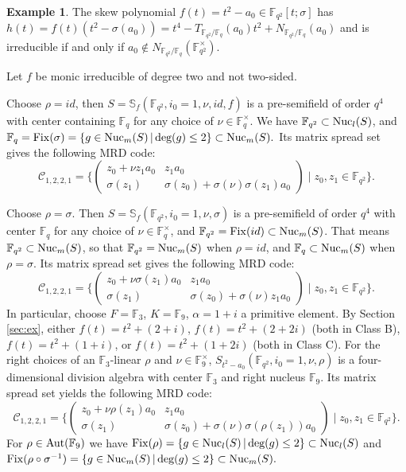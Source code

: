 \documentclass[12pt]{amsart}
\theoremstyle{plain}
\theoremstyle{definition}
\newtheorem{example}[theorem]{Example}
\numberwithin{equation}{section}
\numberwithin{figure}{section}
\begin{document}
 \begin{example}
 The skew polynomial
$f(t)=t^2-a_0\in \mathbb{F}_{q^2}[t;\sigma]$ has $h(t)=f(t) (t^2-\sigma(a_0 ))=t^4-T_{\mathbb{F}_{q^2}/\mathbb{F}_{q}}(a_0)t^2+ N_{\mathbb{F}_{q^2}/\mathbb{F}_{q}}(a_0 )$ and is irreducible if and only if $a_0 \not\in N_{\mathbb{F}_{q^2}/\mathbb{F}_{q}}(\mathbb{F}_{q^2}^\times)$.


Let $f$ be monic irreducible of degree two and not two-sided.

Choose $\rho=id$, then $S=\mathbb{S}_f(\mathbb{F}_{q^2},i_0=1,\nu,id,f)$ is a pre-semifield of order $q^4$  with center containing $\mathbb{F}_q$ for any choice of $\nu\in \mathbb{F}_q^\times$. We have $\mathbb{F}_{q^2}\subset {\rm Nuc}_l(S)$, and
$\mathbb{F}_q={\rm Fix}(\sigma)=\{ g\in {\rm Nuc}_m(S) \,|\, \text{deg}(g)\leq 2\}\subset  {\rm Nuc}_m(S).$
Its matrix spread set gives the following MRD code:
$$\mathcal{C}_{1,2,2,1}=\Big\{
\begin{pmatrix}
z_0+\nu z_1 a_0& z_1 a_0\\
\sigma(z_1)& \sigma(z_0)+ \sigma(\nu)\sigma(z_1) a_0
\end{pmatrix}
\mid z_0,z_1\in \mathbb{F}_{q^2}
\Big\}.$$


Choose $\rho=\sigma$. Then $S=\mathbb{S}_f(\mathbb{F}_{q^2}, i_0=1,\nu,\sigma)$ is a pre-semifield of order $q^4$  with  center $\mathbb{F}_q$ for any choice of $\nu\in \mathbb{F}_q^\times$, and
$\mathbb{F}_{q^2}={\rm Fix}(id)\subset  {\rm Nuc}_m(S)$. That means $\mathbb{F}_{q^2}\subset  {\rm Nuc}_m(S)$, so that $\mathbb{F}_{q^2}=  {\rm Nuc}_m(S)$ when $\rho=id$, and
$\mathbb{F}_{q}\subset  {\rm Nuc}_m(S)$ when $\rho=\sigma$.
Its matrix spread set gives the following MRD code:
 $$\mathcal{C}_{1,2,2,1}=\Big\{
\begin{pmatrix}
z_0+\nu\sigma(z_1)a_0& z_1 a_0\\
\sigma(z_1)& \sigma(z_0)+ \sigma(\nu)z_1 a_0
\end{pmatrix}
\mid z_0,z_1\in \mathbb{F}_{q^2}
\Big\}.$$
In particular, choose  $F=\mathbb{F}_3$, $K=\mathbb{F}_9$,  $\alpha=1+i$ a primitive element.
By Section \ref{sec:ex},
either  $f(t)=t^2+(2+i)$,  $f(t)=t^2+(2+2i)$ (both in Class B),  $f(t)=t^2+(1+i)$, or $f(t)=t^2+(1+2i)$ (both in Class C).
 For the right choices of an $\mathbb{F}_3$-linear $\rho$ and $\nu\in \mathbb{F}_{9}^\times$,
$S_{t^2-a_0}(\mathbb{F}_{q^2},i_0=1,\nu,\rho)$  is a four-dimensional division algebra with center $\mathbb{F}_3$ and right nucleus $\mathbb{F}_{9}$.
Its matrix spread set yields the following MRD code:
$$\mathcal{C}_{1,2,2,1}=\Big\{
\begin{pmatrix}
z_0+\nu\rho(z_1)a_0& z_1 a_0\\
\sigma(z_1)& \sigma(z_0)+ \sigma(\nu)\sigma(\rho(z_1)) a_0
\end{pmatrix}
\mid z_0,z_1\in \mathbb{F}_{q^2}
\Big\}.$$
For $\rho\in {\rm Aut}(\mathbb{F}_{9})$ we have
${\rm Fix}(\rho)=\{g\in {\rm Nuc}_l(S)\,|\, \text{deg}(g)\leq 2\}\subset  {\rm Nuc}_l(S)$ and
${\rm Fix}(\rho \circ\sigma^{-1})=\{ g\in {\rm Nuc}_m(S) \,|\, \text{deg}(g)\leq 2\}\subset  {\rm Nuc}_m(S).$ 
 \end{example}
\end{document}
